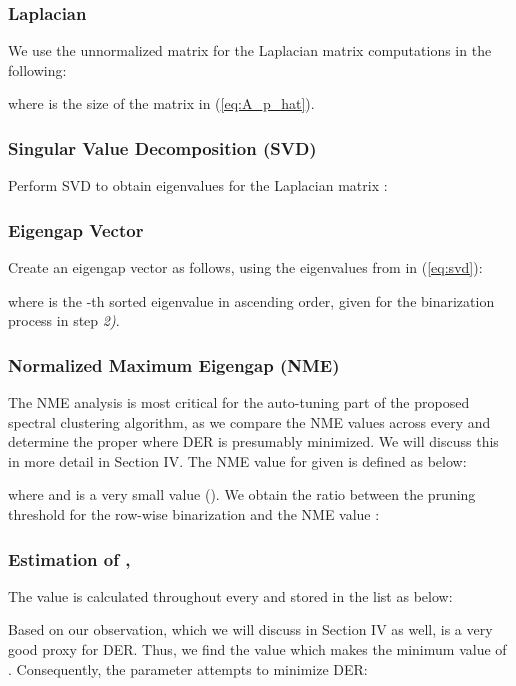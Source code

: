 \documentclass[journal]{IEEEtran}
\begin{document}
  \subsubsection{Laplacian} We use the unnormalized matrix for the Laplacian matrix computations \cite{von2007tutorial} in the following:

where  is the size of the matrix  in (\ref{eq:A_p_hat}).

  \subsubsection{Singular Value Decomposition (SVD)} Perform SVD to obtain eigenvalues for the Laplacian matrix :
     
    \subsubsection{Eigengap Vector} Create an eigengap vector  as follows, using the eigenvalues from  in (\ref{eq:svd}):
    
    where  is the -th sorted eigenvalue in ascending order, given  for the binarization process in step \textit{2)}. 
    \vspace{0.3ex}
    \subsubsection{Normalized Maximum Eigengap (NME)}
    The NME analysis is most critical for the auto-tuning part of the proposed spectral clustering algorithm, as we compare the NME values across every  and determine the proper  where DER is presumably minimized. We will discuss this in more detail in Section IV. The NME value  for given  is defined as below:
        
    where  and  is a very small value (). We obtain the ratio  between the pruning threshold  for the row-wise binarization and the NME value :
    
    \subsubsection{Estimation of , } 
        The value  is calculated throughout every  and stored in the list  as below:
        
        Based on our observation, which we will discuss in Section IV as well,  is a very good proxy for DER. Thus, we find the value  which makes the minimum value of . Consequently, the parameter  attempts to minimize DER:
        
\end{document}
